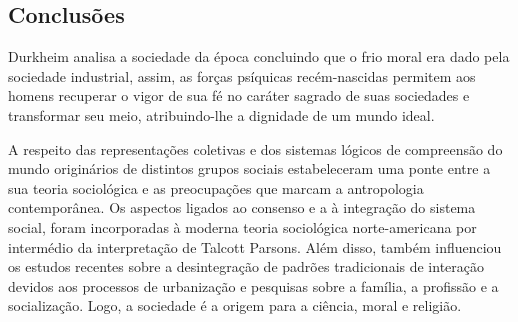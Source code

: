 \subsection{Conclusões}

Durkheim analisa a sociedade da época concluindo que o frio moral era dado pela sociedade industrial, assim, as forças psíquicas recém-nascidas permitem aos homens recuperar o vigor de sua fé no caráter sagrado de suas sociedades e transformar seu meio, atribuindo-lhe a dignidade de um mundo ideal.

A respeito das representações coletivas e dos sistemas lógicos de compreensão do mundo originários de distintos grupos sociais estabeleceram uma ponte entre a sua teoria sociológica e as preocupações que marcam a antropologia contemporânea.
Os aspectos ligados ao consenso e a à integração do sistema social, foram incorporadas à moderna teoria sociológica norte-americana por intermédio da interpretação de Talcott Parsons. 
Além disso, também influenciou os estudos recentes sobre a desintegração de padrões tradicionais de interação devidos aos processos de urbanização e pesquisas sobre a família, a profissão e a socialização.
Logo, a sociedade é a origem para a ciência, moral e religião.
